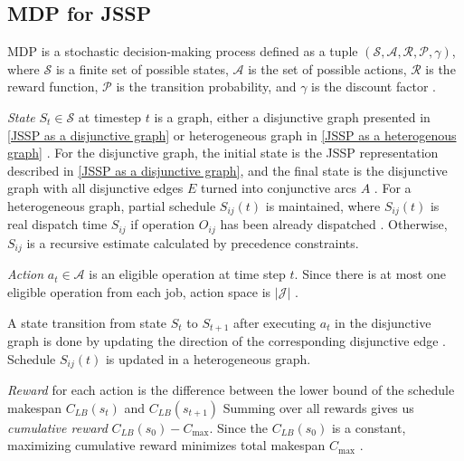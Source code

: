 \subsection{MDP for JSSP}

MDP is a stochastic decision-making process defined as a tuple $(\mathcal{S}, \mathcal{A}, \mathcal{R}, \mathcal{P}, \gamma)$, where $\mathcal{S}$ is a finite set of possible states, $\mathcal{A}$ is the set of possible actions, $\mathcal{R}$ is the reward function,  $\mathcal{P}$ is the transition probability, and $\gamma$ is the discount factor \cite{10226873, jssp_rl_env}. 
\par
\textit{State} $S_t \in \mathcal{S}$ at timestep $t$ is a graph, either a disjunctive graph presented in \ref{JSSP as a disjunctive graph} \cite{zhang2020learning} or heterogeneous graph in \ref{JSSP as a heterogenous graph} \cite{10226873}. For the disjunctive graph, the initial state is the JSSP representation described in \ref{JSSP as a disjunctive graph}, and the final state is the disjunctive graph with all disjunctive edges $E$ turned into conjunctive arcs $A$ \cite{zhang2020learning}. For a heterogeneous graph, partial schedule $S_{ij}(t)$ is maintained, where $S_{ij}(t)$ is real dispatch time $S_{ij}$ if operation $O_{ij}$ has been already dispatched \cite{9826438}. Otherwise, $S_{ij}$ is a recursive estimate calculated by precedence constraints.
\par
\textit{Action} $a_t \in \mathcal{A}$ is an eligible operation at time step $t$. Since there is at most one eligible operation from each job, action space is $\left|\mathcal{J}\right|$ \cite{zhang2020learning}.
\par
A state transition from state $S_t$ to $S_{t+1}$ after executing $a_t$ in the disjunctive graph is done by updating the direction of the corresponding disjunctive edge \cite{zhang2020learning}. Schedule $S_{ij}(t)$ is updated in a heterogeneous graph.
\par
\textit{Reward} for each action is the difference between the lower bound of the schedule makespan $C_{LB}(s_t)$ and $C_{LB}(s_{t+1})$  Summing over all rewards gives us \textit{cumulative reward} $C_{LB}(s_0) - C_\text{max}$. Since the $C_{LB}(s_0)$ is a constant, maximizing cumulative reward minimizes total makespan $C_\text{max}$ \cite{zhang2020learning, 10226873}. 




